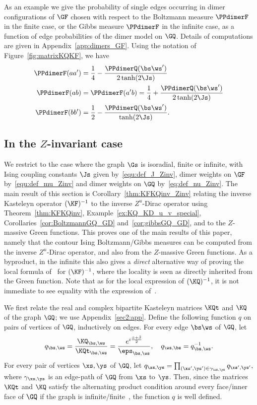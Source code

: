 \documentclass[a4paper,twoside,11pt]{article}
\begin{document}
\begin{exm}\label{ex:prob_GF}
As an example we give the probability of single edges occurring in dimer configurations of $\GF$ chosen with respect to the 
Boltzmann measure $\PPdimerF$ in the finite case, or the Gibbs measure $\PPdimerF$ in the infinite case,
as a function of edge probabilities of the dimer model on $\GQ$. Details of computations are given in Appendix~\ref{app:dimers_GF}. Using the notation of 
Figure~\ref{fig:matrixKQKF}, we have
\begin{align*}
\PPdimerF(aa')&=\frac{1}{4}-\frac{\PPdimerQ(\bs\ws')}{2\tanh(2\Js)}\\
\PPdimerF(ab)&=\PPdimerF(a'b)=\frac{1}{4}+\frac{\PPdimerQ(\bs\ws')}{2\tanh(2\Js)}\\
\PPdimerF(bb')&=\frac{1}{2}-\frac{\PPdimerQ(\bs\ws')}{\tanh(2\Js)}.
\end{align*}
\end{exm}



\subsection{In the $Z$-invariant case}\label{sec:GQ_GF_Zinv}

We restrict to the case where the graph $\Gs$ is isoradial, finite or infinite, with Ising coupling constants $\Js$ given 
by~\eqref{equ:def_J_Zinv}, dimer weights on $\GF$ by~\eqref{equ:def_mu_Zinv} and dimer weights on $\GQ$ by~\eqref{eq:def_nu_Zinv}. 
The main result of this section is Corollary~\ref{thm:KFKQinv_Zinv} relating the inverse Kasteleyn operator $(\KF)^{-1}$ to the inverse $Z^u$-Dirac operator
using Theorem~\ref{thm:KFKQinv}, Example~\ref{ex:KQ_KD_u_v_special}, Corollaries~\ref{cor:BoltzmannGQ_GD} and~\ref{cor:gibbsGQ_GD}, and 
to the $Z$-massive Green functions. This proves one of the main results of this paper, namely that the contour Ising Boltzmann/Gibbs measures can be computed 
from the inverse $Z^u$-Dirac operator, and also from the $Z$-massive Green functions. As a byproduct, in the infinite this also gives 
a \emph{direct} alternative way of proving the local formula of~\cite{BdtR2} for $(\KF)^{-1}$, where the locality is seen as directly inherited from the 
Green function. Note that as for the local expression of $(\KQ)^{-1}$, it is not immediate to see equality with the expression of~\cite{BdtR2}.

We first relate the real and complex bipartite Kasteleyn matrices $\KQt$ and $\KQ$ of the graph $\GQ$; we use Appendix~\ref{sec2:app}.
Define the following function $q$ on pairs of vertices of $\GQ$, inductively on edges.
For every edge $\bs\ws$ of $\GQ$, let
\[
q_{\bs,\ws}=\frac{\KQ_{\bs,\ws}}{\KQt_{\bs,\ws}}=\frac{e^{i\frac{\bar{\alpha}+\bar{\beta}}{2}}}{\eps_{\bs,\ws}}, \quad q_{\ws,\bs}=q_{\bs,\ws}^{-1}.
\]
For every pair of vertices $\xs,\ys$ of $\GQ$, let 
$
q_{\xs,\ys}=\prod_{(\xs',\ys')\in\gamma_{\xs,\ys}}q_{\xs',\ys'},
$
where $\gamma_{\xs,\ys}$ is an edge-path of $\GQ$ from $\xs$ to $\ys$. Then, since the matrices 
$\KQt$ and $\KQ$ satisfy the alternating product condition around every
face/inner face of $\GQ$ if the graph is infinite/finite~\cite{Kuperberg,Kenyon3}, the function $q$ is well defined.
\end{document}
